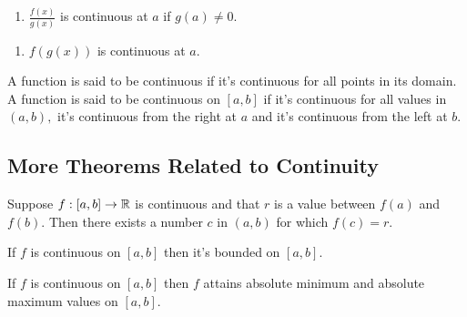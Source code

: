 \documentclass{article}
\begin{document}
\begin{enumerate}
\item $\frac{f(x)}{g(x)}$ is continuous at $a$ if $g(a) \neq 0.$
\end{enumerate}

\begin{enumerate}
\item $f(g(x))$ is continuous at $a.$
\end{enumerate}

A function is said to be \@{continuous} if it's continuous for all points in its domain. A function is said to be continuous on $[a, b]$ if it's continuous for all values in $(a, b),$ it's continuous from the right at $a$ and it's continuous from the left at $b.$

\subsection{More Theorems Related to Continuity}

\begin{theorem}
Suppose $f : [a, b] \to \mathbb{R}$ is \@{continuous} and that $r$ is a value between $f(a)$ and $f(b).$ Then there exists a number $c$ in $(a, b)$ for which $f(c) = r.$
\end{theorem}

\begin{theorem}
If $f$ is continuous on $[a, b]$ then it's bounded on $[a, b].$
\end{theorem}

\begin{theorem}
If $f$ is continuous on $[a, b]$ then $f$ attains absolute minimum and absolute maximum values on $[a, b].$
\end{theorem}
\end{document}
